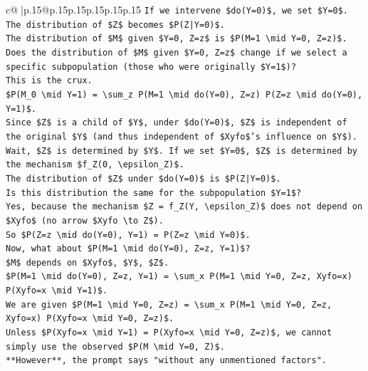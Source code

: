 \documentclass{article}
\begin{document}
{\begin{supertabular}{c@{$\;$}|p{.15\linewidth}@{}p{.15\linewidth}p{.15\linewidth}p{.15\linewidth}p{.15\linewidth}p{.15\linewidth}}
{{{\texttt{If we intervene \$do(Y=0)\$, we set \$Y=0\$.} \\
\texttt{The distribution of \$Z\$ becomes \$P(Z|Y=0)\$.} \\
\texttt{The distribution of \$M\$ given \$Y=0, Z=z\$ is \$P(M=1 \textbackslash{}mid Y=0, Z=z)\$.} \\
\texttt{Does the distribution of \$M\$ given \$Y=0, Z=z\$ change if we select a specific subpopulation (those who were originally \$Y=1\$)?} \\
\texttt{This is the crux.} \\
\texttt{\$P(M\_0 \textbackslash{}mid Y=1) = \textbackslash{}sum\_z P(M=1 \textbackslash{}mid do(Y=0), Z=z) P(Z=z \textbackslash{}mid do(Y=0), Y=1)\$.} \\
\texttt{Since \$Z\$ is a child of \$Y\$, under \$do(Y=0)\$, \$Z\$ is independent of the original \$Y\$ (and thus independent of \$Xyfo\$'s influence on \$Y\$).} \\
\texttt{Wait, \$Z\$ is determined by \$Y\$. If we set \$Y=0\$, \$Z\$ is determined by the mechanism \$f\_Z(0, \textbackslash{}epsilon\_Z)\$.} \\
\texttt{The distribution of \$Z\$ under \$do(Y=0)\$ is \$P(Z|Y=0)\$.} \\
\texttt{Is this distribution the same for the subpopulation \$Y=1\$?} \\
\texttt{Yes, because the mechanism \$Z = f\_Z(Y, \textbackslash{}epsilon\_Z)\$ does not depend on \$Xyfo\$ (no arrow \$Xyfo \textbackslash{}to Z\$).} \\
\texttt{So \$P(Z=z \textbackslash{}mid do(Y=0), Y=1) = P(Z=z \textbackslash{}mid Y=0)\$.} \\
\texttt{Now, what about \$P(M=1 \textbackslash{}mid do(Y=0), Z=z, Y=1)\$?} \\
\texttt{\$M\$ depends on \$Xyfo\$, \$Y\$, \$Z\$.} \\
\texttt{\$P(M=1 \textbackslash{}mid do(Y=0), Z=z, Y=1) = \textbackslash{}sum\_x P(M=1 \textbackslash{}mid Y=0, Z=z, Xyfo=x) P(Xyfo=x \textbackslash{}mid Y=1)\$.} \\
\texttt{We are given \$P(M=1 \textbackslash{}mid Y=0, Z=z) = \textbackslash{}sum\_x P(M=1 \textbackslash{}mid Y=0, Z=z, Xyfo=x) P(Xyfo=x \textbackslash{}mid Y=0, Z=z)\$.} \\
\texttt{Unless \$P(Xyfo=x \textbackslash{}mid Y=1) = P(Xyfo=x \textbackslash{}mid Y=0, Z=z)\$, we cannot simply use the observed \$P(M \textbackslash{}mid Y=0, Z)\$.} \\
\texttt{**However**, the prompt says "without any unmentioned factors".} \\
}}}
\end{supertabular}}
\end{document}
